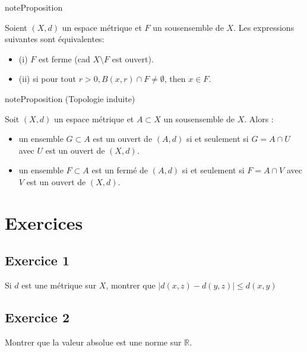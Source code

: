 \documentclass[letterpaper,10pt,french]{sphinxmanual}
\begin{document}
\begin{sphinxadmonition}{note}{Proposition}

\sphinxAtStartPar
Soient \((X, d)\) un espace métrique et \(F\) un sous\sphinxhyphen{}ensemble de \(X\). Les expressions suivantes sont équivalentes:
\begin{itemize}
\item {} 
\sphinxAtStartPar
(i) \(F\) est ferme (cad \(X\setminus F\) est ouvert).

\item {} 
\sphinxAtStartPar
(ii) si pour tout \(r>0, B(x,r)\cap F \neq \emptyset\), then \(x\in F\).

\end{itemize}
\end{sphinxadmonition}

\begin{sphinxadmonition}{note}{Proposition (Topologie induite)}

\sphinxAtStartPar
Soit \((X, d)\) un espace métrique et \(A \subset X\) un sous\sphinxhyphen{}ensemble de \(X\). Alors :
\begin{itemize}
\item {} 
\sphinxAtStartPar
un ensemble \(G \subset A\) est un ouvert de \((A, d)\) si et seulement si \(G=A\cap U\) avec \(U\) est un ouvert de \((X, d)\).

\item {} 
\sphinxAtStartPar
un ensemble \(F \subset A\) est un fermé de \((A, d)\) si et seulement si \(F=A\cap V\) avec \(V\) est un ouvert de \((X, d)\).

\end{itemize}
\end{sphinxadmonition}


\section{Exercices}
\label{\detokenize{exo_metric:exercices}}\label{\detokenize{exo_metric::doc}}

\subsection{Exercice 1}
\label{\detokenize{exo_metric:exercice-1}}
\sphinxAtStartPar
Si \(d\) est une métrique sur \(X\), montrer que \(\left |d(x,z)- d(y,z)\right | \leq d(x,y)\)


\subsection{Exercice 2}
\label{\detokenize{exo_metric:exercice-2}}
\sphinxAtStartPar
Montrer que la valeur absolue est une norme sur \(\mathbb R\).
\end{document}

